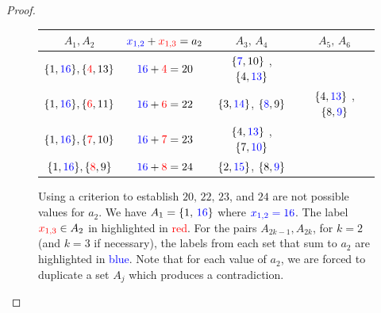 \documentclass[10pt,a4paper]{amsart}
\begin{document}
\begin{proof}
\begin{figure}[ht]
    \centering
\renewcommand{\arraystretch}{1.5}
\begin{tabular}{|c|c|c|c|} \hline
$A_1, A_2$ & $\textcolor{blue}{x_{1,2}} +\textcolor{red}{x_{1,3}}=a_2$ & $A_3,\, A_4$ &  $A_5,\, A_6$ \\  \hline
$\{1, \textcolor{blue}{16}\}, \{\textcolor{red}{4},13\}$ & $\textcolor{blue}{16}+\textcolor{red}{4}=20$ 
&  $\{\textcolor{blue}{7}, 10 \}$ , 
$\{4, \textcolor{blue}{13} \}$ & \\  \hline


$\{1, \textcolor{blue}{16}\}, \{\textcolor{red}{6},11\}$ & $\textcolor{blue}{16}+\textcolor{red}{6}=22$ 
&  $\{3, \textcolor{blue}{14}  \}$, $\{\textcolor{blue}{8}, 9 \}$  
&  $\{4, \textcolor{blue}{13} \}$ , $\{8, \textcolor{blue}{9}\}$ \\  \hline


$\{1, \textcolor{blue}{16}\},   \{\textcolor{red}{7},10\}$ & $\textcolor{blue}{16}+\textcolor{red}{7}=23$ 
&  $\{4, \textcolor{blue}{13} \}$ , $\{7, \textcolor{blue}{10}\}$  & \\  \hline


$\{1, \textcolor{blue}{16}\},    \{\textcolor{red}{8}, 9\}$ & $\textcolor{blue}{16}+\textcolor{red}{8}=24$ 
& $\{ 2,\textcolor{blue}{15}\}$, $\{8, \textcolor{blue}{9}\}$ & \\  \hline
\end{tabular}
    
    \caption{Using a criterion to establish $20,\, 22, \, 23$, and $24$ are not possible values for $a_2$.
    We have $A_1=\{1,\, \textcolor{blue}{16}\}$ where $\textcolor{blue}{x_{1,2}=16}$.
    The label $\textcolor{red}{x_{1,3}}\in A_2$ in highlighted in  \textcolor{red}{red}.
    For the pairs $A_{2k-1}, A_{2k}$, for $k=2$ 
    (and $k=3$ if necessary),
    the labels from each set that sum to $a_2$ are highlighted in 
    \textcolor{blue}{blue}.
    Note that for each value of $a_2$, we are forced to duplicate a set $A_j$ which produces a contradiction.}
    \label{fig:establish_a2_NonvaluesFora1Is17}
\end{figure}
\end{proof}
\end{document}
